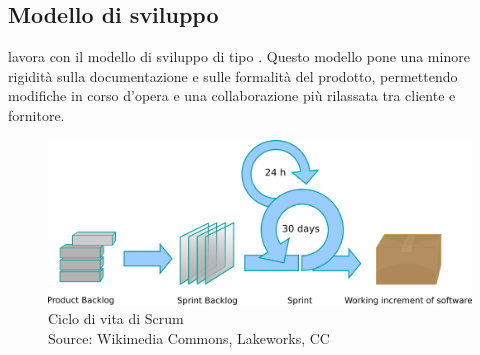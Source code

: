    \subsection{Modello di sviluppo}
   \nomeAzienda{} lavora con il modello di sviluppo  di tipo . Questo modello pone una minore rigidità sulla documentazione e sulle formalità del prodotto, permettendo modifiche in corso d'opera e una collaborazione più rilassata tra cliente e fornitore.

   \begin{figure}[htbp]
      \centering
      \includegraphics[width=14cm]{immagini/scrum-process}
      \caption[Ciclo di vita di Scrum]{Ciclo di vita di Scrum
      \\
      Source: Wikimedia Commons, Lakeworks, CC}
   \end{figure}

